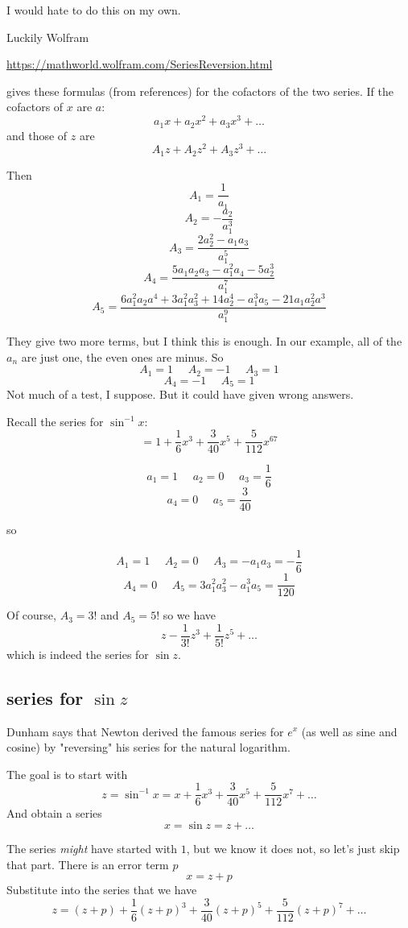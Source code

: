 \documentclass[11pt, oneside]{article}
\begin{document}
I would hate to do this on my own.  

Luckily Wolfram

\url{https://mathworld.wolfram.com/SeriesReversion.html}

gives these formulas (from references) for the cofactors of the two series.  If the cofactors of $x$ are $a$:
\[ a_1x + a_2x^2 + a_3x^3 + \dots \]
and those of $z$ are
\[ A_1z + A_2z^2 + A_3z^3 + \dots \]

Then
\[ A_1 = \frac{1}{a_1} \]
\[ A_2 = - \frac{a_2}{a_1^3} \]
\[ A_3 = \frac{2a_2^2 - a_1a_3}{a_1^5} \]
\[ A_4 = \frac{5 a_1 a_2 a_3 - a_1^2 a_4 - 5 a_2^3}{a_1^7} \]
\[ A_5 = \frac{6a_1^2 a_2 a^4 + 3a_1^2a_3^2 + 14a_2^4 - a_1^3a_5 - 21 a_1a_2^2a^3}{a_1^9} \]

They give two more terms, but I think this is enough.  In our example, all of the $a_n$ are just one, the even ones are minus.  So
\[ A_1 = 1 \ \ \ \ \ \ A_2 = -1 \ \ \ \ \ \ A_3 = 1 \]
\[ A_4 = -1 \ \ \ \ \ \ A_5 = 1 \]
Not much of a test, I suppose.  But it could have given wrong answers.

Recall the series for $\sin^{-1} x$:
\[ = 1 + \frac{1}{6}x^3 + \frac{3}{40} x^5 + \frac{5}{112} x^67 \]

\[ a_1 = 1 \ \ \ \ \ \ a_2 = 0 \ \ \ \ \ \ a_3 =  \frac{1}{6} \]
\[ a_4 =  0  \ \ \ \ \ \ a_5 =  \frac{3}{40} \]

so 

\[ A_1 = 1 \ \ \ \ \ \ A_2 = 0 \ \ \ \ \ \ A_3 = -a_1 a_3 =  -\frac{1}{6} \]
\[ A_4 = 0 \ \ \ \ \ \ A_5 = 3 a_1^2 a_3^2 - a_1^3 a_5 =  \frac{1}{120}  \]

Of course, $A_3 = 3!$ and $A_5 = 5!$ so we have
\[ z - \frac{1}{3!} z^3 + \frac{1}{5!} z^5 + \dots \]
which is indeed the series for $\sin z$.

\subsection*{series for $\sin z$}

Dunham says that Newton derived the famous series for $e^x$ (as well as sine and cosine) by "reversing" his series for the natural logarithm.

The goal is to start with
\[ z = \sin^{-1} x = x + \frac{1}{6}x^3 + \frac{3}{40}x^5 + \frac{5}{112}x^7 + \dots \]
And obtain a series
\[ x = \sin z = z + \dots \]

The series \emph{might} have started with $1$, but we know it does not, so let's just skip that part.  There is an error term $p$
\[ x = z + p \]
Substitute into the series that we have
\[ z  = (z + p) +  \frac{1}{6}(z + p)^3 + \frac{3}{40}(z + p)^5 + \frac{5}{112}(z + p)^7 + \dots   \]
\end{document}
